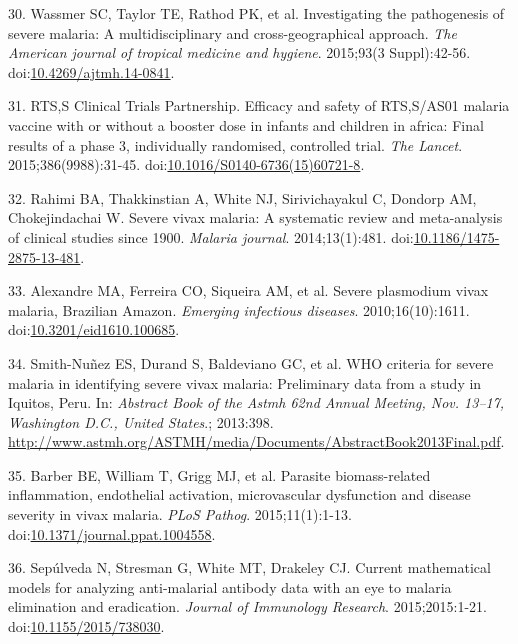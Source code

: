 \documentclass[]{article}
\begin{document}
\hypertarget{ref-wassmer2015}{}
30. Wassmer SC, Taylor TE, Rathod PK, et al. Investigating the
pathogenesis of severe malaria: A multidisciplinary and
cross-geographical approach. \emph{The American journal of tropical
medicine and hygiene}. 2015;93(3 Suppl):42-56.
doi:\href{https://doi.org/10.4269/ajtmh.14-0841}{10.4269/ajtmh.14-0841}.

\hypertarget{ref-rts2015}{}
31. RTS,S Clinical Trials Partnership. Efficacy and safety of RTS,S/AS01
malaria vaccine with or without a booster dose in infants and children
in africa: Final results of a phase 3, individually randomised,
controlled trial. \emph{The Lancet}. 2015;386(9988):31-45.
doi:\href{https://doi.org/10.1016/S0140-6736(15)60721-8}{10.1016/S0140-6736(15)60721-8}.

\hypertarget{ref-rahimi2014meta}{}
32. Rahimi BA, Thakkinstian A, White NJ, Sirivichayakul C, Dondorp AM,
Chokejindachai W. Severe vivax malaria: A systematic review and
meta-analysis of clinical studies since 1900. \emph{Malaria journal}.
2014;13(1):481.
doi:\href{https://doi.org/10.1186/1475-2875-13-481}{10.1186/1475-2875-13-481}.

\hypertarget{ref-alexandre2010}{}
33. Alexandre MA, Ferreira CO, Siqueira AM, et al. Severe plasmodium
vivax malaria, Brazilian Amazon. \emph{Emerging infectious diseases}.
2010;16(10):1611.
doi:\href{https://doi.org/10.3201/eid1610.100685}{10.3201/eid1610.100685}.

\hypertarget{ref-smith2013}{}
34. Smith-Nuñez ES, Durand S, Baldeviano GC, et al. WHO criteria for
severe malaria in identifying severe vivax malaria: Preliminary data
from a study in Iquitos, Peru. In: \emph{Abstract Book of the Astmh 62nd
Annual Meeting, Nov. 13--17, Washington D.C., United States}.; 2013:398.
\url{http://www.astmh.org/ASTMH/media/Documents/AbstractBook2013Final.pdf}.

\hypertarget{ref-barber2015}{}
35. Barber BE, William T, Grigg MJ, et al. Parasite biomass-related
inflammation, endothelial activation, microvascular dysfunction and
disease severity in vivax malaria. \emph{PLoS Pathog}. 2015;11(1):1-13.
doi:\href{https://doi.org/10.1371/journal.ppat.1004558}{10.1371/journal.ppat.1004558}.

\hypertarget{ref-sepulveda2015}{}
36. Sepúlveda N, Stresman G, White MT, Drakeley CJ. Current mathematical
models for analyzing anti-malarial antibody data with an eye to malaria
elimination and eradication. \emph{Journal of Immunology Research}.
2015;2015:1-21.
doi:\href{https://doi.org/10.1155/2015/738030}{10.1155/2015/738030}.
\end{document}
